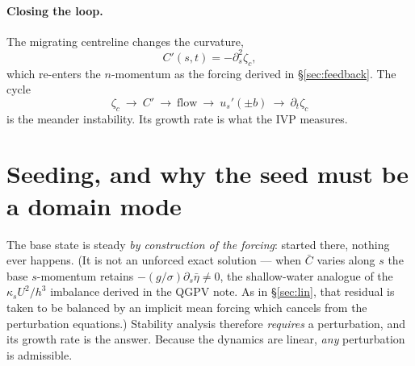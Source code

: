 \documentclass[11pt]{article}
\newcommand{\us}{u_s}
\newcommand{\dt}{\partial_t}
\begin{document}
\paragraph{Closing the loop.} The migrating centreline changes the curvature,
\begin{equation}
  C'(s,t)=-\partial_s^{2}\zeta_c ,
\end{equation}
which re-enters the $n$-momentum as the forcing derived in \S\ref{sec:feedback}.
The cycle
\[
  \zeta_c\ \longrightarrow\ C'\ \longrightarrow\ \text{flow}\ \longrightarrow\
  \us'(\pm b)\ \longrightarrow\ \dt\zeta_c
\]
is the meander instability. Its growth rate is what the IVP measures.

\section{Seeding, and why the seed must be a domain mode}
\label{sec:seed}

The base state is steady \emph{by construction of the forcing}: started there, nothing ever happens. (It is not an unforced exact solution --- when $\bar C$ varies along $s$ the base $s$-momentum retains $-(g/\sigma)\partial_s\bar\eta\neq0$, the shallow-water analogue of the $\kappa_sU^2/h^3$ imbalance derived in the QGPV note. As in \S\ref{sec:lin}, that residual is taken to be balanced by an implicit mean forcing which cancels from the perturbation equations.)
Stability analysis therefore \emph{requires} a perturbation, and its growth rate is
the answer. Because the dynamics are linear, \emph{any} perturbation is admissible.
\end{document}

